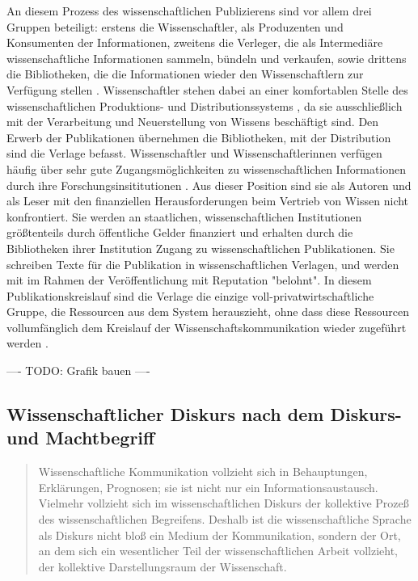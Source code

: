 An diesem Prozess des wissenschaftlichen Publizierens sind vor allem drei Gruppen beteiligt: erstens die Wissenschaftler, als Produzenten und Konsumenten der Informationen, zweitens die Verleger, die als Intermediäre wissenschaftliche Informationen sammeln, bündeln und verkaufen, sowie drittens die Bibliotheken, die die Informationen wieder den Wissenschaftlern zur Verfügung stellen \cite{Odlyzko_1997}. Wissenschaftler stehen dabei an einer komfortablen Stelle des wissenschaftlichen Produktions- und Distributionssystems \cite{herb_2010}, da sie ausschließlich mit der Verarbeitung und Neuerstellung von Wissens beschäftigt sind. Den Erwerb der Publikationen übernehmen die Bibliotheken, mit der Distribution sind die Verlage befasst. Wissenschaftler und Wissenschaftlerinnen verfügen häufig über sehr gute Zugangsmöglichkeiten zu wissenschaftlichen Informationen durch ihre Forschungsinsititutionen \cite{cope2014future}. Aus dieser Position sind sie als Autoren und als Leser mit den finanziellen Herausforderungen beim Vertrieb von Wissen nicht konfrontiert. Sie werden an staatlichen, wissenschaftlichen Institutionen größtenteils durch öffentliche Gelder finanziert und erhalten durch die Bibliotheken ihrer Institution Zugang zu wissenschaftlichen Publikationen. Sie schreiben Texte für die Publikation in wissenschaftlichen Verlagen, und werden mit im Rahmen der Veröffentlichung mit Reputation "belohnt". In diesem Publikationskreislauf sind die Verlage die einzige voll-privatwirtschaftliche Gruppe, die Ressourcen aus dem System herauszieht, ohne dass diese Ressourcen vollumfänglich dem Kreislauf der Wissenschaftskommunikation wieder zugeführt werden \cite{kiley_2006_open}.

---- TODO: Grafik bauen ----

\subsection{Wissenschaftlicher Diskurs nach dem Diskurs- und Machtbegriff}

\begin{quote}Wissenschaftliche Kommunikation vollzieht sich in Behauptungen, Erklärungen, Prognosen; sie ist nicht nur ein Informationsaustausch. Vielmehr vollzieht sich im wissenschaftlichen Diskurs der kollektive Prozeß des wissenschaftlichen Begreifens. Deshalb ist die wissenschaftliche Sprache als Diskurs nicht bloß ein Medium der Kommunikation, sondern der Ort, an dem sich ein wesentlicher Teil der wissenschaftlichen Arbeit vollzieht, der kollektive Darstellungsraum der Wissenschaft. \cite{bohme_1978_wissenschaftssprachen}\end{quote}

